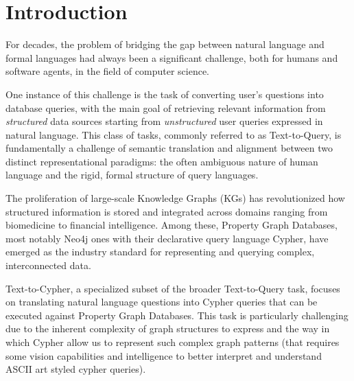 \section{Introduction}
\label{sec:introduction}

For decades, the problem of bridging the gap between natural language and formal languages had always been a significant challenge, both for humans and software agents, in the field of computer science.

One instance of this challenge is the task of converting user's questions into database queries, with the main goal of retrieving relevant information from \textit{structured} data sources starting from \textit{unstructured} user queries expressed in natural language. This class of tasks, commonly referred to as Text-to-Query, is fundamentally a challenge of semantic translation and alignment between two distinct representational paradigms: the often ambiguous nature of human language and the rigid, formal structure of query languages.

The proliferation of large-scale Knowledge Graphs (KGs) has revolutionized how structured information is stored and integrated across domains ranging from biomedicine to financial intelligence. Among these, Property Graph Databases, most notably Neo4j ones with their declarative query language Cypher, have emerged as the industry standard for representing and querying complex, interconnected data.

Text-to-Cypher, a specialized subset of the broader Text-to-Query task, focuses on translating natural language questions into Cypher queries that can be executed against Property Graph Databases. This task is particularly challenging due to the inherent complexity of graph structures to express and the way in which Cypher allow us to represent such complex graph patterns (that requires some vision capabilities and intelligence to better interpret and understand ASCII art styled cypher queries). 

